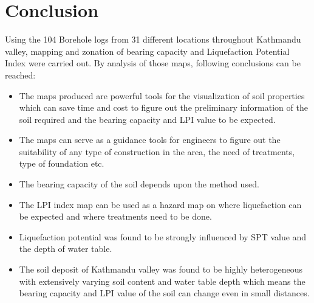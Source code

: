 \chapter{Conclusion}
Using the 104 Borehole logs from 31 different locations throughout Kathmandu valley, mapping and zonation of bearing capacity and Liquefaction Potential Index were carried out. By analysis of those maps, following conclusions can be reached:

\begin{itemize}
\item The maps produced are powerful tools for the visualization of soil properties which can save time and cost to figure out the preliminary information of the soil required and the bearing capacity and LPI value to be expected.
\item The maps can serve as a guidance tools for engineers to figure out the suitability of any type of construction in the area, the need of treatments, type of foundation etc.
\item The bearing capacity of the soil depends upon the method used.
\item The LPI index map can be used as a hazard map on where liquefaction can be expected and where treatments need to be done.
\item Liquefaction potential was found to be strongly influenced by SPT value and the depth of water table.
\item The soil deposit of Kathmandu valley was found to be highly heterogeneous with extensively varying soil content and water table depth which means the bearing capacity and LPI value of the soil can change even in small distances.
\end{itemize}
